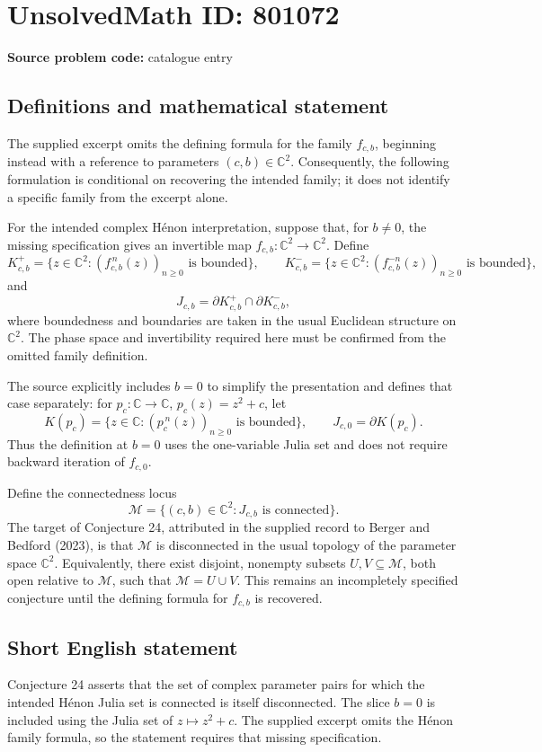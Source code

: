 \documentclass[11pt]{article}
\newcommand{\C}{\mathbb{C}}
\begin{document}
\section*{UnsolvedMath ID: 801072}
\textbf{Source problem code:} catalogue entry
\subsection{Definitions and mathematical statement}
The supplied excerpt omits the defining formula for the family \(f_{c,b}\), beginning instead with a reference to parameters \((c,b)\in\C^2\). Consequently, the following formulation is conditional on recovering the intended family; it does not identify a specific family from the excerpt alone.

For the intended complex H\'enon interpretation, suppose that, for \(b\ne0\), the missing specification gives an invertible map \(f_{c,b}:\C^2\to\C^2\). Define
\[
K^+_{c,b}=\{z\in\C^2:(f_{c,b}^{\,n}(z))_{n\ge0}\text{ is bounded}\},
\qquad
K^-_{c,b}=\{z\in\C^2:(f_{c,b}^{-n}(z))_{n\ge0}\text{ is bounded}\},
\]
and
\[
J_{c,b}=\partial K^+_{c,b}\cap\partial K^-_{c,b},
\]
where boundedness and boundaries are taken in the usual Euclidean structure on \(\C^2\). The phase space and invertibility required here must be confirmed from the omitted family definition.

The source explicitly includes \(b=0\) to simplify the presentation and defines that case separately: for \(p_c:\C\to\C\), \(p_c(z)=z^2+c\), let
\[
K(p_c)=\{z\in\C:(p_c^{\,n}(z))_{n\ge0}\text{ is bounded}\},
\qquad J_{c,0}=\partial K(p_c).
\]
Thus the definition at \(b=0\) uses the one-variable Julia set and does not require backward iteration of \(f_{c,0}\).

Define the connectedness locus
\[
\mathcal M=\{(c,b)\in\C^2:J_{c,b}\text{ is connected}\}.
\]
The target of Conjecture 24, attributed in the supplied record to Berger and Bedford (2023), is that \(\mathcal M\) is disconnected in the usual topology of the parameter space \(\C^2\). Equivalently, there exist disjoint, nonempty subsets \(U,V\subseteq\mathcal M\), both open relative to \(\mathcal M\), such that \(\mathcal M=U\cup V\). This remains an incompletely specified conjecture until the defining formula for \(f_{c,b}\) is recovered.
\subsection{Short English statement}
Conjecture 24 asserts that the set of complex parameter pairs for which the intended H\'enon Julia set is connected is itself disconnected. The slice \(b=0\) is included using the Julia set of \(z\mapsto z^2+c\). The supplied excerpt omits the H\'enon family formula, so the statement requires that missing specification.
\end{document}
